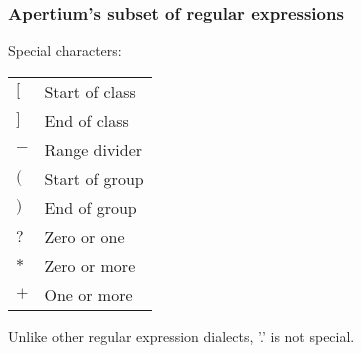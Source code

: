 \documentclass{beamer} %
\begin{document}
\begin{frame}
  \frametitle{Apertium's subset of regular expressions}

  \begin{exampleblock}{Special characters:}
    \begin{tabular}{ll}
      $[$ & Start of class \\
      $]$ & End of class \\
      \hline
      $-$ & Range divider \\
      \hline
      $($ & Start of group \\
      $)$ & End of group \\
      \hline
      $?$ & Zero or one \\
      $*$ & Zero or more \\
      $+$ & One or more \\
    \end{tabular}
  \end{exampleblock}

  Unlike other regular expression dialects, '.' is not special.
\end{frame}
\end{document}
